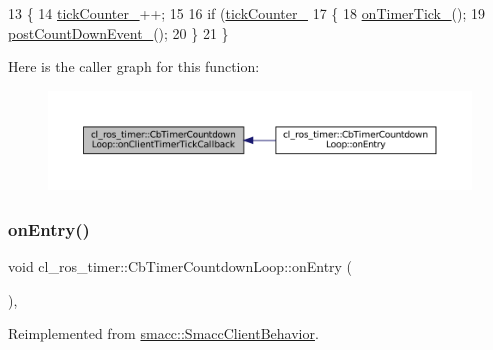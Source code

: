 \begin{DoxyCode}
13 \{
14     \hyperlink{classcl__ros__timer_1_1CbTimerCountdownLoop_a2b2d192bae0da3d26c6e3011583f9a6a}{tickCounter\_}++;
15 
16     \textcolor{keywordflow}{if} (\hyperlink{classcl__ros__timer_1_1CbTimerCountdownLoop_a2b2d192bae0da3d26c6e3011583f9a6a}{tickCounter\_} %
17     \{
18         \hyperlink{classcl__ros__timer_1_1CbTimerCountdownLoop_a9df6547f8ddf45107d8850d8a1a92cf4}{onTimerTick\_}();
19         \hyperlink{classcl__ros__timer_1_1CbTimerCountdownLoop_aafc2594c2923e4a355394ffb339d1800}{postCountDownEvent\_}();
20     \}
21 \}
\end{DoxyCode}
Here is the caller graph for this function\+:
\nopagebreak
\begin{figure}[H]
\begin{center}
\leavevmode
\includegraphics[width=350pt]{classcl__ros__timer_1_1CbTimerCountdownLoop_acb16f3448ad5955bf36e7c2cfd9f691c_icgraph}
\end{center}
\end{figure}
\mbox{\label{classcl__ros__timer_1_1CbTimerCountdownLoop_aa088f15db4fb2c307c86b30b2e1f7744}} 
\subsubsection{\texorpdfstring{on\+Entry()}{onEntry()}}
{\footnotesize\ttfamily void cl\+\_\+ros\+\_\+timer\+::\+Cb\+Timer\+Countdown\+Loop\+::on\+Entry (\begin{DoxyParamCaption}{ }\end{DoxyParamCaption})\hspace{0.3cm}{\ttfamily [override]}, {\ttfamily [virtual]}}



Reimplemented from \hyperlink{classsmacc_1_1SmaccClientBehavior_a7962382f93987c720ad432fef55b123f}{smacc\+::\+Smacc\+Client\+Behavior}.



